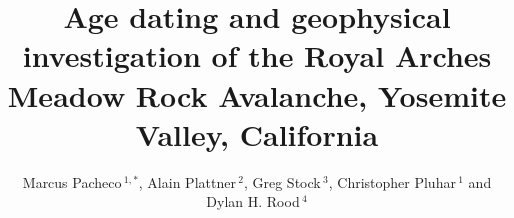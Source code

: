 \documentclass[utf8]{frontiersSCNS}
\def\firstAuthorLast{Pacheco {et~al.}} %
\def\Authors{Marcus Pacheco\,$^{1,*}$, Alain Plattner\,$^{2}$, Greg Stock\,$^{3}$, Christopher Pluhar\,$^{1}$ and Dylan H. Rood\,$^{4}$}
\begin{document}
\onecolumn
{}


\title[Royal Arches Meadow rock avalanche]{Age dating and geophysical investigation of the Royal Arches Meadow Rock Avalanche, Yosemite Valley, California}

\author[\firstAuthorLast ]{\Authors} %
\address{} %
\correspondance{} %

\extraAuth{}%







\maketitle
\end{document}
